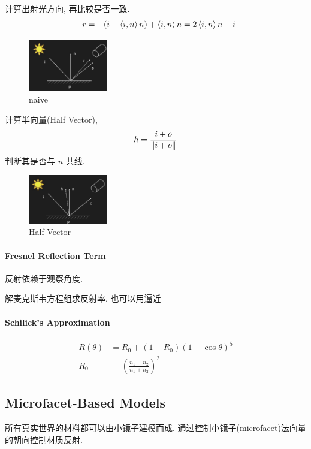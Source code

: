 计算出射光方向, 再比较是否一致.
\begin{align*}
    -r=-(i-\braket{i,n}n)+\braket{i,n}n=2\braket{i,n}n-i
\end{align*}
\begin{figure}[!htb]
    \centering
    \includegraphics[width=0.309\textwidth]{pic/ACG4/计算}
    \caption{naive}
\end{figure}


计算半向量(Half Vector),
\begin{align*}
    h=\frac{i+o}{\left\lVert i+o\right\rVert}
\end{align*}
判断其是否与 $n$ 共线. 
\begin{figure}[!htb]
    \centering
    \includegraphics[width=0.309\textwidth]{pic/ACG4/Half Vector}
    \caption{Half Vector}
\end{figure}

\paragraph{Fresnel Reflection Term}
反射依赖于观察角度. 

解麦克斯韦方程组求反射率, 也可以用逼近

\paragraph{Schilick's Approximation}
\begin{align*}
    R(\theta)&=R_0+(1-R_0)(1-\cos\theta)^5\\
    R_0&=\left( \frac{n_1-n_2}{n_1+n_2} \right)^2
\end{align*}


\subsection{Microfacet-Based Models}
所有真实世界的材料都可以由小镜子建模而成. 通过控制小镜子(microfacet)法向量的朝向控制材质反射.

